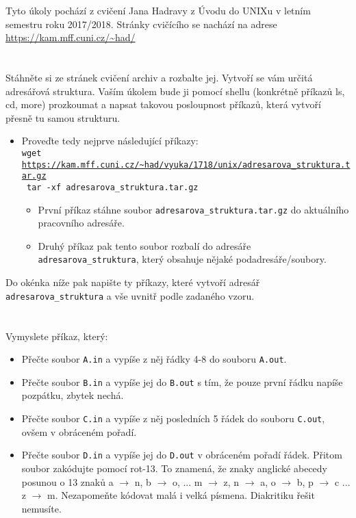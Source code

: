 \documentclass{scrartcl}
\begin{document}
        Tyto úkoly pochází z cvičení Jana Hadravy z Úvodu do UNIXu v letním semestru roku 2017/2018. Stránky cvičícího se nachází na adrese \url{https://kam.mff.cuni.cz/~had/}

        \section{}
        Stáhněte si ze stránek cvičení archiv a rozbalte jej. Vytvoří se vám určitá adresářová struktura. Vaším úkolem bude ji pomocí shellu (konkrétně příkazů ls, cd, more) prozkoumat a napsat takovou posloupnost příkazů, která vytvoří přesně tu samou strukturu.\\ 

        \begin{itemize}
                \item Proveďte tedy nejprve následující příkazy:\\
                \texttt{wget \url{https://kam.mff.cuni.cz/~had/vyuka/1718/unix/adresarova_struktura.tar.gz}} \\
                \texttt{ tar -xf adresarova\_struktura.tar.gz}
                \begin{itemize}
                        \item První příkaz stáhne soubor \texttt{adresarova\_struktura.tar.gz} do aktuálního pracovního adresáře.
                        \item Druhý příkaz pak tento soubor rozbalí do adresáře \texttt{adresarova\_struktura}, který obsahuje nějaké podadresáře/soubory. 
                \end{itemize}
        \end{itemize}

        Do okénka níže pak napište ty příkazy, které vytvoří adresář \texttt{adresarova\_struktura} a vše uvnitř podle zadaného vzoru. 

        \section{}
        Vymyslete příkaz, který: 
        \begin{itemize}
                \item Přečte soubor \texttt{A.in} a vypíše z něj řádky 4-8 do souboru \texttt{A.out}.
                \item Přečte soubor \texttt{B.in} a vypíše jej do \texttt{B.out} s tím, že pouze první řádku napíše pozpátku, zbytek nechá. 
                \item Přečte soubor \texttt{C.in} a vypíše z něj posledních 5 řádek do souboru \texttt{C.out}, ovšem v obráceném pořadí. 
                \item Přečte soubor \texttt{D.in} a vypíše jej do \texttt{D.out} v obráceném pořadí řádek. Přitom soubor zakódujte pomocí rot-13. To znamená, že znaky anglické abecedy posunou o 13 znaků a $\rightarrow$ n, b $\rightarrow$ o, ... m $\rightarrow$ z, n $\rightarrow$ a, o $\rightarrow$ b, p $\rightarrow$ c ... z $\rightarrow$ m. Nezapomeňte kódovat malá i velká písmena. Diakritiku řešit nemusíte. 
        \end{itemize}
\end{document}
